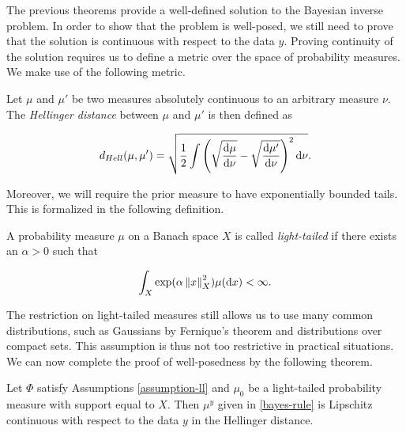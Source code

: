 The previous theorems provide a well-defined solution to the Bayesian inverse problem. In order to show that the problem is well-posed, we still need to prove that the solution is continuous with respect to the data $y$. Proving continuity of the solution requires us to define a metric over the space of probability measures. We make use of the following metric.

\begin{definition} Let $\mu$ and $\mu'$ be two measures absolutely continuous to an arbitrary measure $\nu$. The \textit{Hellinger distance} between $\mu$ and $\mu'$ is then defined as

  \begin{equation*}
    d_{Hell}(\mu, \mu') = \sqrt{\frac12\int\left(\sqrt{\frac{\text{d} \mu}{\text{d} \nu}} - \sqrt{\frac{\text{d} \mu'}{\text{d} \nu}}\right)^2\text{d} \nu}.
  \end{equation*}
\end{definition}

Moreover, we will require the prior measure to have exponentially bounded tails. This is formalized in the following definition.

\begin{definition}
  A probability measure $\mu$ on a Banach space $X$ is called \textit{light-tailed} if there exists an $\alpha > 0$ such that

  \begin{equation*}
    \int_X\exp(\alpha\left\lVert x\right\rVert^2_X)\mu(\text{d} x) < \infty.
  \end{equation*}
\end{definition}

The restriction on light-tailed measures still allows us to use many common distributions, such as Gaussians by Fernique's theorem and distributions over compact sets. This assumption is thus not too restrictive in practical situations. We can now complete the proof of well-posedness by the following theorem.

\begin{theorem}
  Let $\Phi$ satisfy Assumptions \ref{assumption-ll} and $\mu_0$ be a light-tailed probability measure with support equal to $X$. Then $\mu^y$ given in \ref{bayes-rule} is Lipschitz continuous with respect to the data $y$ in the Hellinger distance.
\end{theorem}

